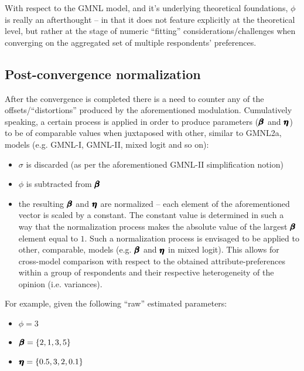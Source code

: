 \documentclass[12pt,a4paper]{article}
\begin{document}
With respect to the GMNL model, and it's underlying theoretical foundations, \(\phi\) is really an afterthought -- in that it does not feature explicitly at the theoretical level, but rather at the stage of numeric ``fitting'' considerations/challenges when converging on the aggregated set of multiple respondents' preferences.

\subsection{Post-convergence normalization}

After the convergence is completed there is a need to counter any of the offsets/``distortions'' produced by the aforementioned modulation. Cumulatively speaking, a certain process is applied in order to produce parameters (\(\pmb{\hm{\beta}}\) and \(\pmb{\hm{\eta}}\)) to be of comparable values when juxtaposed with other, similar to GMNL2a, models (e.g. GMNL-I, GMNL-II, mixed logit and so on):

\begin{itemize}

\item \(\sigma\) is discarded (as per the aforementioned GMNL-II simplification notion)

\item \( \phi \) is subtracted from \( \pmb{\hm{\beta}} \)

\item the resulting \( \pmb{\hm{\beta}} \) and \( \pmb{\hm{\eta}} \) are normalized -- each element of the aforementioned vector is scaled by a constant. The constant value is determined in such a way that the normalization process makes the absolute value of the largest \( \pmb{\hm{\beta}} \) element equal to \(1\). Such a normalization process is envisaged to be applied to other, comparable, models (e.g. \( \pmb{\hm{\beta}} \) and \( \pmb{\hm{\eta}} \) in mixed logit). This allows for cross-model comparison with respect to the obtained attribute-preferences within a group of respondents and their respective heterogeneity of the opinion (i.e. variances).
\end{itemize}

For example, given the following ``raw'' estimated parameters:

\begin{itemize}
\item \( \phi = 3 \)
\item \(\pmb{\hm{\beta}} = \{2, 1, 3, 5\}\)
\item \(\pmb{\hm{\eta}} = \{0.5, 3, 2, 0.1\}\)
\end{itemize}
\end{document}
